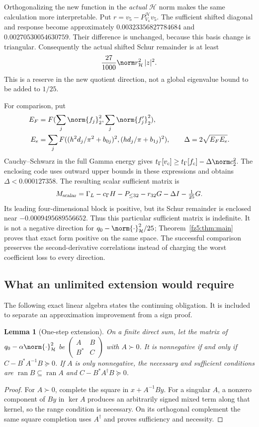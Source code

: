 \documentclass[11pt,a4paper]{article}
\numberwithin{equation}{section}
\newtheorem{lemma}[theorem]{Lemma}
\theoremstyle{definition}\newtheorem{definition}[theorem]{Definition}
\theoremstyle{remark}\newtheorem{remark}[theorem]{Remark}
\newcommand{\Hh}{\mathcal H}\newcommand{\Hw}{\mathcal H}
\begin{document}
Orthogonalizing the new function in the \emph{actual} $\Hh$ norm makes
the same calculation more interpretable. Put $r=v_5-P_{V_4}^{\Hh}v_5$.
The sufficient shifted diagonal and response become approximately
$0.00323356827784684$ and $0.00270530054630759$. Their difference is
unchanged, because this basis change is triangular. Consequently the
actual shifted Schur remainder is at least
\begin{equation}\label{fz5:eq:intrinsic}
 \frac{27}{1000}\norm r_\Hh^2\,|z|^2.
\end{equation}
This is a reserve in the new quotient direction, not a global eigenvalue
bound to be added to $1/25$.

For comparison, put
\begin{align*}
 E_F&=F(\sum_j\norm{f_j}_2^2,\sum_j\norm{f_j'}_2^2),\\
 E_e&=\sum_jF((h^2d_j/\pi^2+b_{0j})^2,(hd_j/\pi+b_{1j})^2),
 \qquad \Delta=2\sqrt{E_FE_e}.
\end{align*}
Cauchy--Schwarz in the full Gamma energy gives
$t_\Gamma[v_c]\ge t_\Gamma[f_c]-\Delta\norm c_2^2$.
The enclosing code uses outward upper bounds in these expressions and
obtains $\Delta<0.000127358$. The resulting scalar sufficient matrix is
\[
 M_{\rm scalar}=\Gamma_L-c_\Gamma H-P_{\le32}-r_{32}G
                        -\Delta I-\tfrac1{25}G.
\]
Its leading four-dimensional block is positive, but its Schur remainder
is enclosed near $-0.0009495689556652$. Thus this particular sufficient
matrix is indefinite. It is not a negative direction for $q_0-\norm{\cdot}_\Hh^2/25$;
Theorem~\ref{fz5:thm:main} proves that exact form positive on the same space.
The successful comparison preserves the second-derivative correlations
instead of charging the worst coefficient loss to every direction.

\subsection{What an unlimited extension would require}
The following exact linear algebra states the continuing obligation.
It is included to separate an approximation improvement from a sign proof.

\begin{lemma}[One-step extension]
On a finite direct sum, let the matrix of $q_0-\alpha\norm{\cdot}_\Hh^2$
be $\left(\begin{smallmatrix}A&B\\B^*&C\end{smallmatrix}\right)$ with
$A\succ0$. It is nonnegative if and only if
$C-B^*A^{-1}B\succeq0$.
If $A$ is only nonnegative, the necessary and sufficient conditions are
$\operatorname{ran}B\subseteq\operatorname{ran}A$ and
$C-B^*A^\dagger B\succeq0$.
\end{lemma}
\begin{proof}
For $A\succ0$, complete the square in $x+A^{-1}By$.
For a singular $A$, a nonzero component of $By$ in $\ker A$ produces
an arbitrarily signed mixed term along that kernel, so the range
condition is necessary. On its orthogonal complement the same square
completion uses $A^\dagger$ and proves sufficiency and necessity.
\end{proof}
\end{document}
